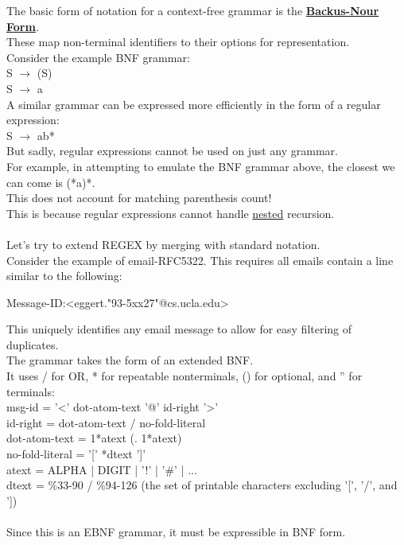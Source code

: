 \documentclass[../../lecture_notes.tex]{subfiles}
\begin{document}
The basic form of notation for a context-free grammar is the \textbf{\underline{Backus-Nour Form}}.\\
These map non-terminal identifiers to their options for representation.\\
Consider the example BNF grammar:\\
\indent S $\rightarrow$ (S)\\
\indent S $\rightarrow$ a\\
A similar grammar can be expressed more efficiently in the form of a regular expression:\\
\indent S $\rightarrow$ ab*\\
But sadly, regular expressions cannot be used on just any grammar.\\
For example, in attempting to emulate the BNF grammar above, the closest we can come is (*a)*.\\
This does not account for matching parenthesis count!\\
This is because regular expressions cannot handle \underline{nested} recursion.\\
\\
Let's try to extend REGEX by merging with standard notation.\\
Consider the example of email-RFC5322.  This requires all emails contain a line similar to the following:
\begin{center} Message-ID:<eggert."93-5xx27"@cs.ucla.edu> \end{center}
This uniquely identifies any email message to allow for easy filtering of duplicates.\\
The grammar takes the form of an extended BNF.\\
It uses / for OR, * for repeatable nonterminals, () for optional, and '' for terminals:\\
\indent msg-id = '<' dot-atom-text '@' id-right '>'\\
\indent id-right = dot-atom-text / no-fold-literal\\
\indent dot-atom-text = 1*atext (. 1*atext)\\
\indent no-fold-literal = '[' *dtext ']'\\
\indent atext = ALPHA | DIGIT | '!' | '\#' | ...\\
\indent dtext = \%33-90 / \%94-126 (the set of printable characters excluding '[', '/', and '])\\
\\
Since this is an EBNF grammar, it must be expressible in BNF form.\\
\end{document}
